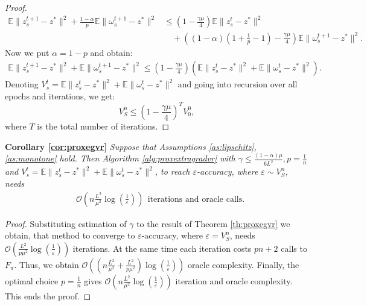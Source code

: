 \documentclass{article}
\begin{document}
\begin{proof}
        \begin{align*}
            \mathbb E\|z_s^{t+1} - z^*\|^2 + \frac{1-\alpha}{p} \mathbb E\|\omega_s^{t+1} - z^*\|^2 &\leqslant \left(1 - \frac{\gamma\mu}{4}\right)\mathbb E\|z_s^t - z^*\|^2 \\
            & \quad + \left((1-\alpha)\left(1 + \frac{1}{p} - 1\right) - \frac{\gamma\mu}{4}\right)\mathbb E\|\omega_s^{t+1} - z^*\|^2.
        \end{align*}
        Now we put $\alpha = 1 - p$ and obtain:
        \begin{align*}
            \mathbb E\|z_s^{t+1} - z^*\|^2 + \mathbb E\|\omega_s^{t+1} - z^*\|^2 \leqslant \left(1 - \frac{\gamma\mu}{4}\right)\left(\mathbb E\|z_s^t - z^*\|^2 + \mathbb E\|\omega_s^t - z^*\|^2\right).
        \end{align*}
        Denoting $V_s^t = \mathbb E\|z_s^t - z^*\|^2 + \mathbb E\|\omega_s^t - z^*\|^2$ and going into recursion over all epochs and iterations, we get:
        \begin{equation*}
            V_S^n \leqslant \left(1 - \frac{\gamma\mu}{4}\right)^T V_0^0,
        \end{equation*}
        where $T$ is the total number of iterations. 
\end{proof}    
\textbf{Corollary \ref{cor:proxegvr}}
\textit{Suppose that Assumptions \ref{as:lipschitz}, \ref{as:monotone} hold. Then Algorithm \ref{alg:proxextragradvr} with $\gamma \leqslant\frac{(1-\alpha)\mu}{6L^2}, p = \frac{1}{n}$ and $V_s^t =\mathbb E \|z_s^t - z^*\|^2 + \mathbb E\|\omega_s^t - z^*\|^2$, to reach $\varepsilon$-accuracy, where $\varepsilon \sim V_S^n$, needs}
\begin{align*}
    &\mathcal{O}\left(n\frac{L^2}{\mu^2}\log\left(\frac{1}{\varepsilon}\right)\right) ~~\text{iterations and oracle calls.}
    \end{align*}
\begin{proof}   
        Substituting estimation of $\gamma$ to the result of Theorem \ref{th:proxegvr} we obtain, that method to converge to $\varepsilon$-accuracy, where $\varepsilon = V_S^n$, needs $\mathcal{O}\left(\frac{L^2}{p\mu^2}\log\left(\frac{1}{\varepsilon}\right)\right)$ iterations. At the same time each iteration costs $pn + 2$ calls to $F_{\pi}$. Thus, we obtain $\mathcal{O}\left(\left(n\frac{L^2}{\mu^2} + \frac{L^2}{p\mu^2}\right)\log\left(\frac{1}{\varepsilon}\right)\right)$ oracle complexity. Finally, the optimal choice $p = \frac{1}{n}$ gives $\mathcal{O}\left(n\frac{L^2}{\mu^2}\log\left(\frac{1}{\varepsilon}\right)\right)$ iteration and oracle complexity. This ends the proof.
\end{proof}
\end{document}
